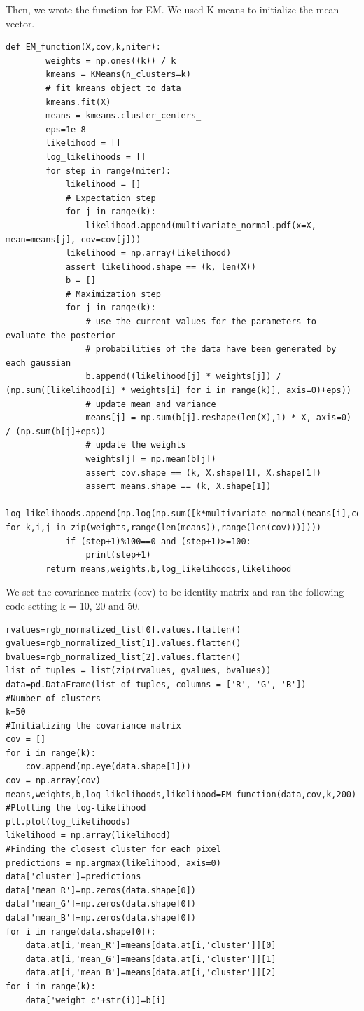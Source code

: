 \documentclass{article}      %
\begin{document}
Then, we wrote the function for EM. We used K means to initialize the mean vector. 
\begin{lstlisting}
def EM_function(X,cov,k,niter):    
        weights = np.ones((k)) / k
        kmeans = KMeans(n_clusters=k)
        # fit kmeans object to data
        kmeans.fit(X)
        means = kmeans.cluster_centers_
        eps=1e-8
        likelihood = []
        log_likelihoods = []
        for step in range(niter):
            likelihood = []
            # Expectation step
            for j in range(k):
                likelihood.append(multivariate_normal.pdf(x=X, mean=means[j], cov=cov[j]))
            likelihood = np.array(likelihood)
            assert likelihood.shape == (k, len(X))
            b = []
            # Maximization step 
            for j in range(k):
                # use the current values for the parameters to evaluate the posterior
                # probabilities of the data have been generated by each gaussian
                b.append((likelihood[j] * weights[j]) / (np.sum([likelihood[i] * weights[i] for i in range(k)], axis=0)+eps))
                # update mean and variance
                means[j] = np.sum(b[j].reshape(len(X),1) * X, axis=0) / (np.sum(b[j]+eps))
                # update the weights
                weights[j] = np.mean(b[j])
                assert cov.shape == (k, X.shape[1], X.shape[1])
                assert means.shape == (k, X.shape[1])
            log_likelihoods.append(np.log(np.sum([k*multivariate_normal(means[i],cov[j]).pdf(X) for k,i,j in zip(weights,range(len(means)),range(len(cov)))])))
            if (step+1)%100==0 and (step+1)>=100:
                print(step+1)
        return means,weights,b,log_likelihoods,likelihood
\end{lstlisting}

We set the covariance matrix (cov) to be identity matrix and ran the following code setting k = 10, 20 and 50.

\begin{lstlisting}
rvalues=rgb_normalized_list[0].values.flatten()
gvalues=rgb_normalized_list[1].values.flatten()
bvalues=rgb_normalized_list[2].values.flatten()
list_of_tuples = list(zip(rvalues, gvalues, bvalues))  
data=pd.DataFrame(list_of_tuples, columns = ['R', 'G', 'B'])
#Number of clusters
k=50
#Initializing the covariance matrix
cov = []
for i in range(k):
    cov.append(np.eye(data.shape[1]))
cov = np.array(cov)
means,weights,b,log_likelihoods,likelihood=EM_function(data,cov,k,200)
#Plotting the log-likelihood
plt.plot(log_likelihoods)
likelihood = np.array(likelihood)
#Finding the closest cluster for each pixel
predictions = np.argmax(likelihood, axis=0)
data['cluster']=predictions
data['mean_R']=np.zeros(data.shape[0])
data['mean_G']=np.zeros(data.shape[0])
data['mean_B']=np.zeros(data.shape[0])
for i in range(data.shape[0]):
    data.at[i,'mean_R']=means[data.at[i,'cluster']][0]
    data.at[i,'mean_G']=means[data.at[i,'cluster']][1]
    data.at[i,'mean_B']=means[data.at[i,'cluster']][2]
for i in range(k):
    data['weight_c'+str(i)]=b[i]
\end{lstlisting}
\end{document}
